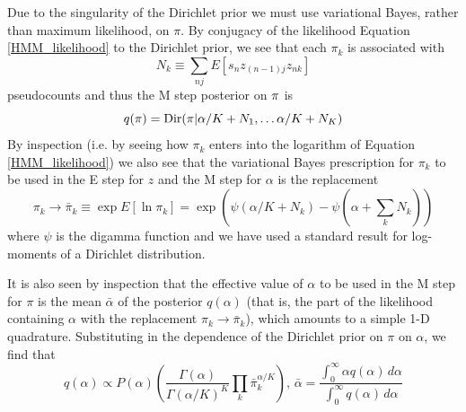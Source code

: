 \documentclass[nofootinbib,amssymb,amsmath]{revtex4}
\begin{document}
Due to the singularity of the Dirichlet prior we must use variational Bayes, rather than maximum likelihood, on $\pi$.  By conjugacy of the likelihood Equation \ref{HMM_likelihood} to the Dirichlet prior, we see that each $\pi_k$ is associated with
\begin{equation}
N_k \equiv \sum_{nj} E[s_n z_{(n-1)j} z_{nk}]
\label{pseudocounts}
\end{equation}
pseudocounts and thus the M step posterior on ${\bf \pi}$ is
%
\begin{equation}
q(\pi) = {\rm Dir}(\pi | \alpha/K + N_1, \ldots \alpha/K + N_K)
\end{equation}
%
By inspection (i.e. by seeing how $\pi_k$ enters into the logarithm of Equation \ref{HMM_likelihood}) we also see that the variational Bayes prescription for $\pi_k$ to be used in the E step for $z$ and the M step for $\alpha$ is the replacement
\begin{equation}
\pi_k \rightarrow \bar{\pi}_k \equiv  \exp E[\ln \pi_k] = \exp \left( \psi(\alpha/K + N_k) - \psi(\alpha + \sum_k N_k) \right)
\label{pi_bar}
\end{equation}
where $\psi$ is the digamma function and we have used a standard result for log-moments of a Dirichlet distribution.

It is also seen by inspection that the effective value of $\alpha$ to be used in the M step for $\pi$ is the mean $\bar{\alpha}$ of the posterior $q(\alpha)$ (that is, the part of the likelihood containing $\alpha$ with the replacement $\pi_k \rightarrow \bar{\pi}_k$), which amounts to a simple 1-D quadrature.  Substituting in the dependence of the Dirichlet prior on $\pi$ on $\alpha$, we find that
\begin{equation}
q(\alpha) \propto P(\alpha) \left( \frac{ \Gamma(\alpha) }{\Gamma(\alpha/K)^K} \prod_k \bar{\pi}_k^{\alpha/K} \right), \, \bar{\alpha} = \frac{ \int_0^\infty \alpha q(\alpha) \, d \alpha}{\int_0^\infty q(\alpha) \, d \alpha}
\label{alpha_bar}
\end{equation}
\end{document}
